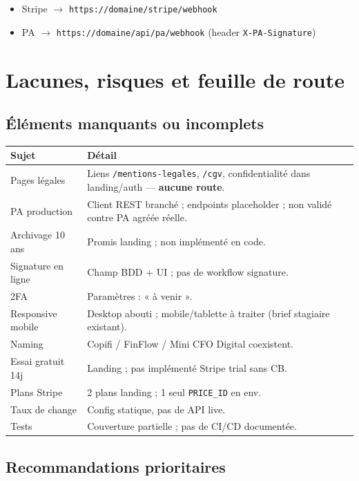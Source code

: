 \documentclass[11pt,a4paper]{report}
\begin{document}
\begin{itemize}[leftmargin=1.5em]
    \item Stripe $\rightarrow$ \texttt{https://domaine/stripe/webhook}
    \item PA $\rightarrow$ \texttt{https://domaine/api/pa/webhook} (header \texttt{X-PA-Signature})
\end{itemize}

\chapter{Lacunes, risques et feuille de route}

\section{Éléments manquants ou incomplets}

\begin{longtable}{@{}p{4.5cm}p{8.8cm}@{}}
\toprule
\textbf{Sujet} & \textbf{Détail} \\
\midrule
\endhead
Pages légales &
Liens \texttt{/mentions-legales}, \texttt{/cgv}, confidentialité dans landing/auth — \textbf{aucune route}. \\
PA production &
Client REST branché ; endpoints placeholder ; non validé contre PA agréée réelle. \\
Archivage 10 ans &
Promis landing ; non implémenté en code. \\
Signature en ligne &
Champ BDD + UI ; pas de workflow signature. \\
2FA &
Paramètres : « à venir ». \\
Responsive mobile &
Desktop abouti ; mobile/tablette à traiter (brief stagiaire existant). \\
Naming &
Copifi / FinFlow / Mini CFO Digital coexistent. \\
Essai gratuit 14j &
Landing ; pas implémenté Stripe trial sans CB. \\
Plans Stripe &
2 plans landing ; 1 seul \texttt{PRICE\_ID} en env. \\
Taux de change &
Config statique, pas de API live. \\
Tests &
Couverture partielle ; pas de CI/CD documentée. \\
\bottomrule
\end{longtable}

\section{Recommandations prioritaires}
\end{document}
